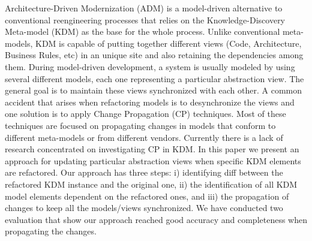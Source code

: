 %
Architecture-Driven Modernization (ADM) is a model-driven alternative to conventional reengineering processes that relies on the Knowledge-Discovery Meta-model (KDM) as the base for the whole process. Unlike conventional meta-models, KDM is capable of putting together different views (Code, Architecture, Business Rules, etc) in an unique site and also retaining the dependencies among them. During model-driven development, a system is usually modeled by using several different models, each one representing a particular abstraction view. The general goal is to maintain these views synchronized with each other. A common accident that arises when refactoring models is to desynchronize the views and one solution is to apply Change Propagation (CP) techniques. Most of these techniques are focused on propagating changes in models that conform to different meta-models or from different vendors. Currently there is a lack of research concentrated on investigating CP in KDM. In this paper we present an approach for updating  particular abstraction views when specific KDM elements are refactored. Our approach has three steps: i) identifying diff between the refactored KDM instance and the original one, ii) the identification of all KDM model elements dependent on the refactored ones, and iii) the propagation of changes to keep all the models/views synchronized. We have conducted two evaluation that show our approach reached good accuracy and completeness when propagating the changes.